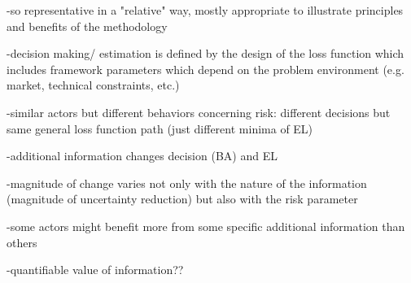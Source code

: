 	-so representative in a "relative" way, mostly appropriate to illustrate principles and benefits of the methodology
	
	-decision making/ estimation is defined by the design of the loss function which includes framework parameters which depend on the problem environment (e.g. market, technical constraints, etc.)
	
	-similar actors but different behaviors concerning risk: different decisions but same general loss function path (just different minima of EL)
	
	-additional information changes decision (BA) and EL
	
	-magnitude of change varies not only with the nature of the information (magnitude of uncertainty reduction) but also with the risk parameter
	
	-some actors might benefit more from some specific additional information than others
	
	-quantifiable value of information??